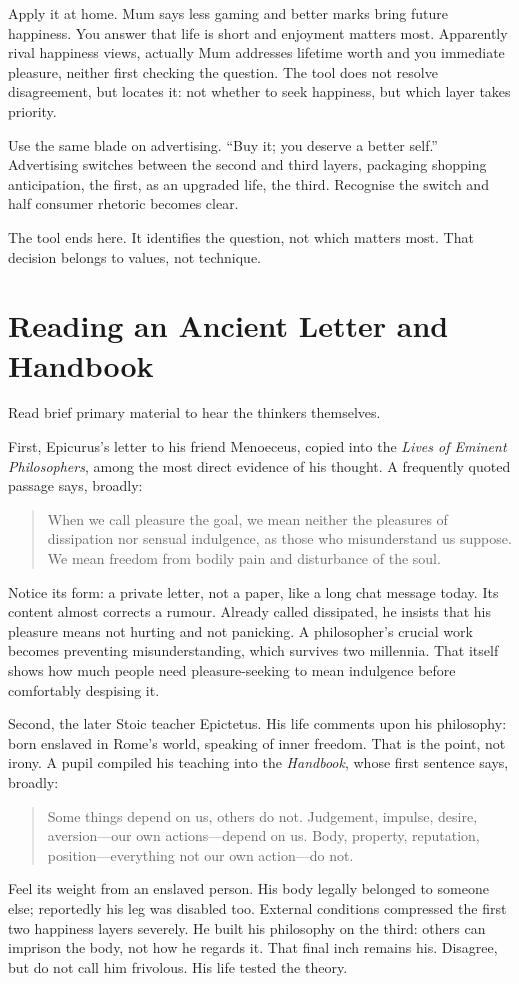 Apply it at home. Mum says less gaming and better marks bring future happiness. You answer that life is short and enjoyment matters most. Apparently rival happiness views, actually Mum addresses lifetime worth and you immediate pleasure, neither first checking the question. The tool does not resolve disagreement, but locates it: not whether to seek happiness, but which layer takes priority.

Use the same blade on advertising. ``Buy it; you deserve a better self.'' Advertising switches between the second and third layers, packaging shopping anticipation, the first, as an upgraded life, the third. Recognise the switch and half consumer rhetoric becomes clear.

The tool ends here. It identifies the question, not which matters most. That decision belongs to values, not technique.

\section{Reading an Ancient Letter and Handbook}
Read brief primary material to hear the thinkers themselves.

First, Epicurus's letter to his friend Menoeceus, copied into the \textit{Lives of Eminent Philosophers}, among the most direct evidence of his thought. A frequently quoted passage says, broadly:

\begin{quote}
When we call pleasure the goal, we mean neither the pleasures of dissipation nor sensual indulgence, as those who misunderstand us suppose. We mean freedom from bodily pain and disturbance of the soul.
\end{quote}
Notice its form: a private letter, not a paper, like a long chat message today. Its content almost corrects a rumour. Already called dissipated, he insists that his pleasure means not hurting and not panicking. A philosopher's crucial work becomes preventing misunderstanding, which survives two millennia. That itself shows how much people need pleasure-seeking to mean indulgence before comfortably despising it.

Second, the later Stoic teacher Epictetus. His life comments upon his philosophy: born enslaved in Rome's world, speaking of inner freedom. That is the point, not irony. A pupil compiled his teaching into the \textit{Handbook}, whose first sentence says, broadly:

\begin{quote}
Some things depend on us, others do not. Judgement, impulse, desire, aversion---our own actions---depend on us. Body, property, reputation, position---everything not our own action---do not.
\end{quote}
Feel its weight from an enslaved person. His body legally belonged to someone else; reportedly his leg was disabled too. External conditions compressed the first two happiness layers severely. He built his philosophy on the third: others can imprison the body, not how he regards it. That final inch remains his. Disagree, but do not call him frivolous. His life tested the theory.

